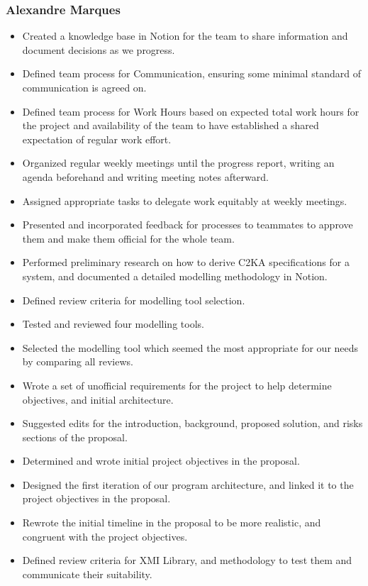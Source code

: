 \subsubsection{Alexandre Marques}
\begin{itemize}
    \item Created a knowledge base in Notion for the team to share information and document decisions as we progress.
    \item Defined team process for Communication, ensuring some minimal standard of communication is agreed on.
    \item Defined team process for Work Hours based on expected total work hours for the project and availability
    of the team to have established a shared expectation of regular work effort.
    \item Organized regular weekly meetings until the progress report, writing an agenda beforehand and writing meeting notes afterward.
    \item Assigned appropriate tasks to delegate work equitably at weekly meetings.
    \item Presented and incorporated feedback for processes to teammates to approve them and make them official for the whole team.
    \item Performed preliminary research on how to derive C2KA specifications for a system, and documented a detailed modelling methodology in Notion.
    \item Defined review criteria for modelling tool selection.
    \item Tested and reviewed four modelling tools.
    \item Selected the modelling tool which seemed the most appropriate for our needs by comparing all reviews.
    \item Wrote a set of unofficial requirements for the project to help determine objectives, and initial architecture.
    \item Suggested edits for the introduction, background, proposed solution, and risks sections of the proposal.
    \item Determined and wrote initial project objectives in the proposal.
    \item Designed the first iteration of our program architecture, and linked it to the project objectives in the proposal.
    \item Rewrote the initial timeline in the proposal to be more realistic, and congruent with the project objectives.
    \item Defined review criteria for XMI Library, and methodology to test them and communicate their suitability.

\end{itemize}
